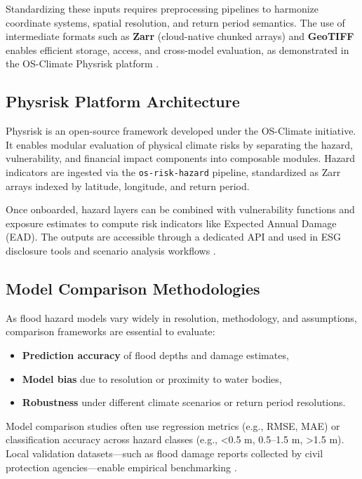 Standardizing these inputs requires preprocessing pipelines to harmonize coordinate systems, spatial resolution, and return period semantics. The use of intermediate formats such as \textbf{Zarr} (cloud-native chunked arrays) and \textbf{GeoTIFF} enables efficient storage, access, and cross-model evaluation, as demonstrated in the OS-Climate Physrisk platform \cite{moorhouse2024}.

\subsection{Physrisk Platform Architecture}

Physrisk is an open-source framework developed under the OS-Climate initiative. It enables modular evaluation of physical climate risks by separating the hazard, vulnerability, and financial impact components into composable modules. Hazard indicators are ingested via the \texttt{os-risk-hazard} pipeline, standardized as Zarr arrays indexed by latitude, longitude, and return period.

Once onboarded, hazard layers can be combined with vulnerability functions and exposure estimates to compute risk indicators like Expected Annual Damage (EAD). The outputs are accessible through a dedicated API and used in ESG disclosure tools and scenario analysis workflows \cite{moorhouse2024}.

\subsection{Model Comparison Methodologies}

As flood hazard models vary widely in resolution, methodology, and assumptions, comparison frameworks are essential to evaluate:

\begin{itemize}
    \item \textbf{Prediction accuracy} of flood depths and damage estimates,
    \item \textbf{Model bias} due to resolution or proximity to water bodies,
    \item \textbf{Robustness} under different climate scenarios or return period resolutions.
\end{itemize}

Model comparison studies often use regression metrics (e.g., RMSE, MAE) or classification accuracy across hazard classes (e.g., <0.5 m, 0.5–1.5 m, >1.5 m). Local validation datasets—such as flood damage reports collected by civil protection agencies—enable empirical benchmarking \cite{urszr_damage_data, ward_assessing_2013}.

